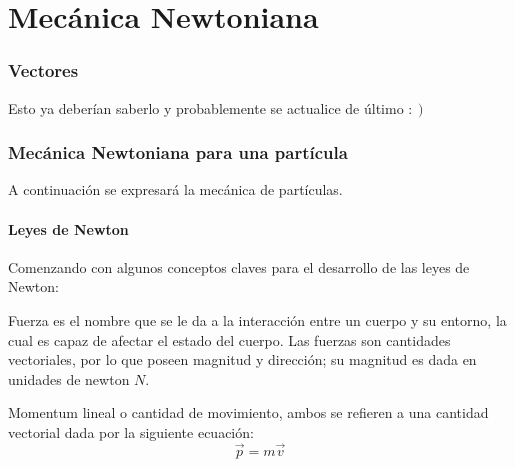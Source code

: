 \documentclass[/home/hernan/Documentos/Apuntes_mecanica_teorica/main.tex]{subfiles}
\begin{document}
	\part{Mecánica Newtoniana} 
	\label{prt:Mecánica Newtoniana}

	\section{Vectores}\label{sec:vectores}


	Esto ya deberían saberlo y probablemente se actualice de último $: \left . \right)$

	\newpage
	\section{Mecánica Newtoniana para una partícula}\label{sec: N.particula }

	A continuación se expresará la mecánica de partículas.

	\subsection{Leyes de Newton}
	
	Comenzando con algunos conceptos claves para el desarrollo de las leyes de Newton:

	\begin{definition}
		Fuerza es el nombre que se le da a la interacción entre un cuerpo y su entorno, la cual es capaz de afectar el estado del cuerpo. Las fuerzas son cantidades vectoriales, por lo que poseen magnitud y dirección; su magnitud es dada en unidades de newton $N$.
	\end{definition}

	\begin{definition}
		Momentum lineal o cantidad de movimiento, ambos se refieren a una cantidad vectorial dada por la siguiente ecuación:
		\begin{equation}
			\vec{p} = m \vec{v}
			\label{eq: momentuml}
		\end{equation}
	\end{definition}

	
\end{document}

